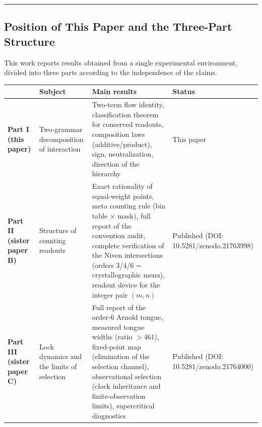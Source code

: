 \documentclass[
  a4paper,
]{article}
\newcounter{none} %
\begin{document}
\begin{center}\rule{0.5\linewidth}{0.5pt}\end{center}

\subsection{Position of This Paper and the Three-Part
Structure}\label{position-of-this-paper-and-the-three-part-structure}

This work reports results obtained from a single experimental
environment, divided into three parts according to the independence of
the claims.

{\def\LTcaptype{none} %
\begin{longtable}[]{@{}
  >{\raggedright\arraybackslash}p{}
  >{\raggedright\arraybackslash}p{}
  >{\raggedright\arraybackslash}p{}
  >{\raggedright\arraybackslash}p{}@{}}
\toprule\noalign{}
\begin{minipage}[b]{\linewidth}\raggedright
\end{minipage} & \begin{minipage}[b]{\linewidth}\raggedright
Subject
\end{minipage} & \begin{minipage}[b]{\linewidth}\raggedright
Main results
\end{minipage} & \begin{minipage}[b]{\linewidth}\raggedright
Status
\end{minipage} \\
\midrule\noalign{}
\endhead
\bottomrule\noalign{}
\endlastfoot
\textbf{Part I (this paper)} & Two-grammar decomposition of interaction
& Two-term flow identity, classification theorem for conserved readouts,
composition laws (additive/product), sign, neutralization, direction of
the hierarchy & This paper \\
\textbf{Part II (sister paper B)} & Structure of counting readouts &
Exact rationality of equal-weight points, meta counting rule (bin table
× mask), full report of the convention audit, complete verification of
the Niven intersections (orders 3/4/6 = crystallographic menu), readout
device for the integer pair \((m,n)\) & Published (DOI:
10.5281/zenodo.21763998) \\
\textbf{Part III (sister paper C)} & Lock dynamics and the limits of
selection & Full report of the order-6 Arnold tongue, measured tongue
widths (ratio \(>461\)), fixed-point map (elimination of the selection
channel), observational selection (clock inheritance and
finite-observation limits), supercritical diagnostics & Published (DOI:
10.5281/zenodo.21764000) \\
\end{longtable}
}
\end{document}
